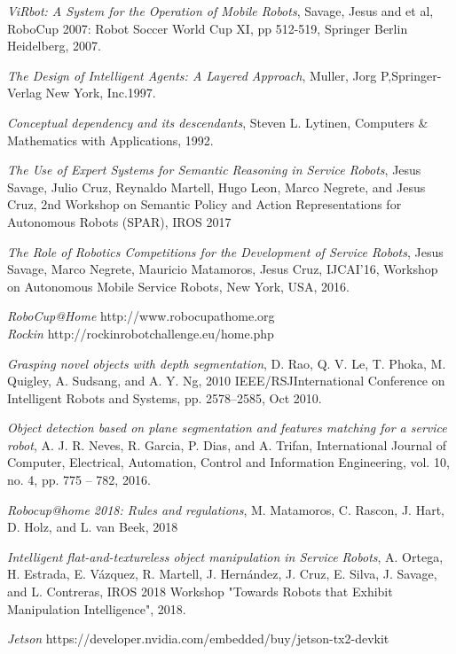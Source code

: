 \documentclass{llncs}
\begin{document}
\begin{thebibliography}{1}

{\em ViRbot: A System for the Operation of Mobile Robots}, Savage, Jesus and et al, RoboCup 2007: Robot Soccer World Cup XI,
pp 512-519, Springer Berlin Heidelberg, 2007.

{\em The Design of Intelligent Agents: A Layered Approach}, Muller, Jorg P,Springer-Verlag New York, Inc.1997.

{\em Conceptual dependency and its descendants}, Steven L. Lytinen, Computers \& Mathematics with Applications, 1992.

\textit{The Use of Expert Systems for Semantic Reasoning in Service Robots}, Jesus Savage, Julio Cruz, Reynaldo Martell, Hugo Leon, Marco Negrete, and Jesus Cruz, 2nd Workshop on Semantic Policy and Action Representations for Autonomous Robots (SPAR), IROS 2017

{\em The Role of Robotics Competitions for the Development of Service Robots}, 
 Jesus Savage, Marco Negrete, Mauricio Matamoros, Jesus Cruz,
IJCAI'16, Workshop on Autonomous Mobile Service Robots, New York, USA, 2016.

{\em RoboCup@Home} http://www.robocupathome.org
\\
{\em Rockin} http://rockinrobotchallenge.eu/home.php

\textit{Grasping novel objects with depth segmentation}, D. Rao, Q. V. Le, T. Phoka, M. Quigley, A. Sudsang, and A. Y. Ng, 2010 IEEE/RSJInternational Conference on Intelligent Robots and Systems, pp. 2578–2585, Oct 2010.

\textit{Object detection
based on plane segmentation and features matching for a service
robot}, A. J. R. Neves, R. Garcia, P. Dias, and A. Trifan, International Journal of Computer, Electrical, Automation, Control and Information Engineering, vol. 10, no. 4, pp. 775 – 782, 2016.

\textit{Robocup@home 2018: Rules and regulations}, M. Matamoros, C. Rascon, J. Hart, D. Holz, and L. van Beek, 2018

\textit{Intelligent flat-and-textureless object manipulation in Service Robots}, A. Ortega, H. Estrada, E. Vázquez, R. Martell, J. Hernández, J. Cruz, E. Silva, J. Savage, and L. Contreras, IROS 2018 Workshop "Towards Robots that Exhibit Manipulation Intelligence", 2018.

{\em Jetson} https://developer.nvidia.com/embedded/buy/jetson-tx2-devkit

\end{thebibliography}
\end{document}
